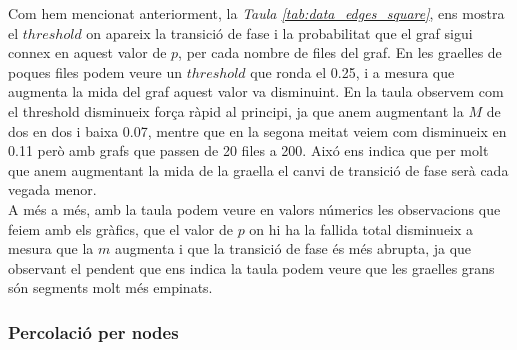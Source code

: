 \documentclass[a4paper]{article}
\begin{document}
	Com hem mencionat anteriorment, la \textit{Taula \ref{tab:data_edges_square}}, ens mostra el $threshold$ on apareix la transició de fase i la probabilitat que el graf sigui connex en aquest valor de $p$, per cada nombre de files del graf. En les graelles de poques files podem veure un $threshold$ que ronda el 0.25, i a mesura que augmenta la mida del graf aquest valor va disminuint. En la taula observem com el threshold disminueix força ràpid al principi, ja que anem augmentant la $M$ de dos en dos i baixa 0.07, mentre que en la segona meitat veiem com disminueix en 0.11 però amb grafs que passen de 20 files a 200. Aixó ens indica que per molt que anem augmentant la mida de la graella el canvi de transició de fase serà cada vegada menor. \\
	
	A més a més, amb la taula podem veure en valors númerics les observacions que feiem amb els gràfics, que el valor de $p$ on hi ha la fallida total disminueix a mesura que la $m$ augmenta i que la transició de fase és més abrupta, ja que observant el pendent que ens indica la taula podem veure que les graelles grans són segments molt més empinats.
	
	\subsubsection{Percolació per nodes}
	
\end{document}
